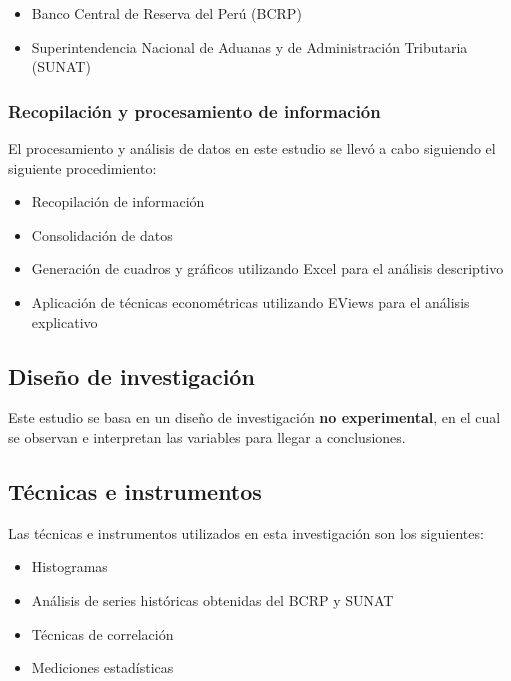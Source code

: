 \documentclass[
  letterpaper,
  DIV=11,
  numbers=noendperiod]{scrartcl}
\providecommand{\tightlist}{%
  \setlength{\itemsep}{0pt}\setlength{\parskip}{0pt}}\usepackage{longtable,booktabs,array}
\begin{document}
\begin{itemize}
\item
  Banco Central de Reserva del Perú (BCRP)
\item
  Superintendencia Nacional de Aduanas y de Administración Tributaria
  (SUNAT)
\end{itemize}

\hypertarget{recopilaciuxf3n-y-procesamiento-de-informaciuxf3n}{%
\subsubsection{Recopilación y procesamiento de
información}\label{recopilaciuxf3n-y-procesamiento-de-informaciuxf3n}}

El procesamiento y análisis de datos en este estudio se llevó a cabo
siguiendo el siguiente procedimiento:

\begin{itemize}
\tightlist
\item
  Recopilación de información
\item
  Consolidación de datos
\item
  Generación de cuadros y gráficos utilizando Excel para el análisis
  descriptivo
\item
  Aplicación de técnicas econométricas utilizando EViews para el
  análisis explicativo
\end{itemize}

\hypertarget{diseuxf1o-de-investigaciuxf3n}{%
\subsection{Diseño de
investigación}\label{diseuxf1o-de-investigaciuxf3n}}

Este estudio se basa en un diseño de investigación \textbf{no
experimental}, en el cual se observan e interpretan las variables para
llegar a conclusiones.

\hypertarget{tuxe9cnicas-e-instrumentos}{%
\subsection{Técnicas e instrumentos}\label{tuxe9cnicas-e-instrumentos}}

Las técnicas e instrumentos utilizados en esta investigación son los
siguientes:

\begin{itemize}
\tightlist
\item
  Histogramas
\item
  Análisis de series históricas obtenidas del BCRP y SUNAT
\item
  Técnicas de correlación
\item
  Mediciones estadísticas
\end{itemize}
\end{document}
